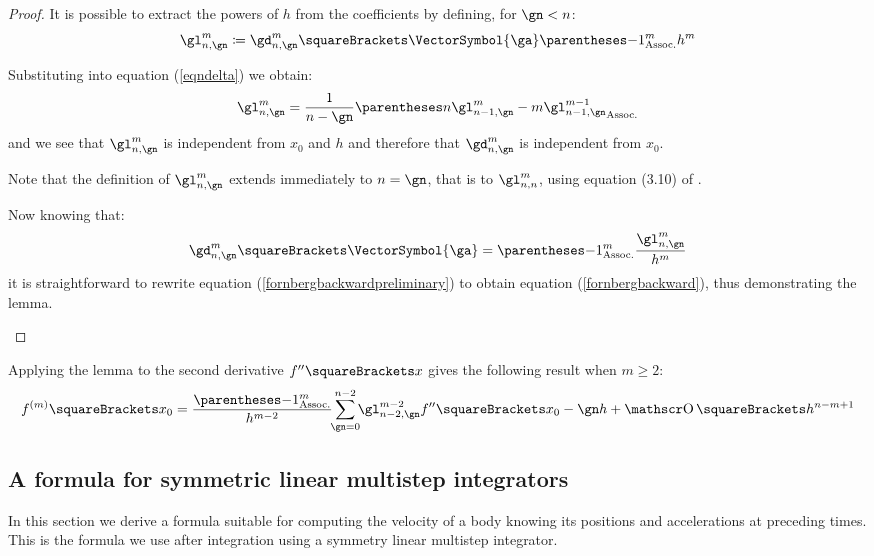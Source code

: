 \documentclass[10pt, a4paper, twoside]{basestyle}
\begin{document}
\begin{lemma}
\begin{proof}
It is possible to extract the powers of $h$ from the coefficients by defining, for $\gn < n$:
\[
\gl^{m}_{n,\gn} \DefineAs \gd^{m}_{n,\gn}\of{\VectorSymbol{\ga}} \pa{-1}^m h^m
\]

Substituting into equation (\ref{eqndelta}) we obtain:
\[
\gl^{m}_{n,\gn} = \frac{1}{n - \gn} \pa{n \gl^{m}_{n - 1,\gn} - m \gl^{m - 1}_{n - 1,\gn}}
\]
and we see that $\gl^{m}_{n,\gn}$ is independent from $x_0$ and $h$ and therefore that $\gd^{m}_{n,\gn}$ is independent from $x_0$.

Note that the definition of $\gl^{m}_{n,\gn}$ extends immediately to $n = \gn$, that is to $\gl^{m}_{n,n}$, using equation (3.10) of \cite{Fornberg1988}.

Now knowing that:
\[
\gd^{m}_{n,\gn}\of{\VectorSymbol{\ga}} = \pa{-1}^m \frac{\gl^{m}_{n,\gn}}{h^m}
\]
it is straightforward to rewrite equation (\ref{fornbergbackwardpreliminary}) to obtain equation (\ref{fornbergbackward}), thus demonstrating the lemma.

\vspace{-\belowdisplayskip}\[\]
\end{proof}
\end{lemma}

\begin{corollary}
Applying the lemma to the second derivative $f\dersecond\of{x}$ gives the following result when $m ≥ 2$:
\begin{equation}
f^{(m)}\of{x_0} = \frac{\pa{-1}^m}{h^{m - 2}} \sum{\gn = 0}[n - 2]{\gl^{m - 2}_{n - 2,\gn} f\dersecond\of{x_0 - \gn h}} + \BigO\of{h^{n - m + 1}}
\label{eqnfornbergbackward2}
\end{equation}
\end{corollary}

\subsection*{A formula for symmetric linear multistep integrators}
In this section we derive a formula suitable for computing the velocity of a body knowing its positions and accelerations at preceding times.  This is the formula we use after integration using a symmetry linear multistep integrator.
\end{document}

